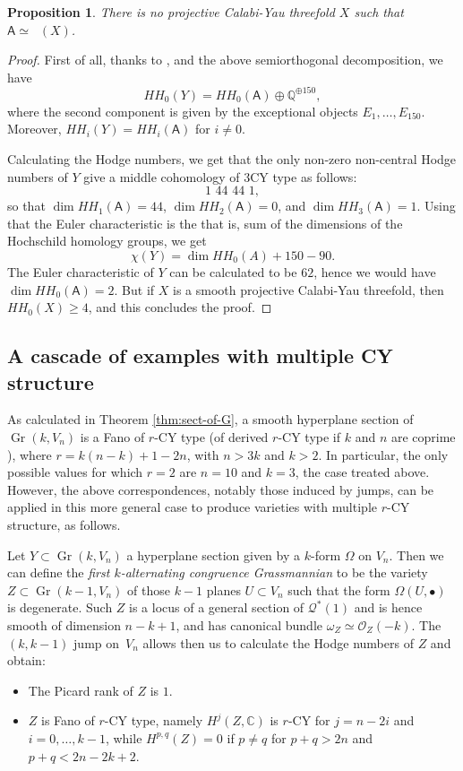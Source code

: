 \documentclass[JEP,XML,SOM,Unicode,NoEqCountersInSection]{cedram}
\newcommand{\sbullet}{{\scriptstyle\bullet}}
\newcommand{\HH}{\textit{HH}}
\let\mathcal\mathscr
\theoremstyle{plain}
\newtheorem{prop}[theorem]{Proposition}
\theoremstyle{definition}
\newcommand{\cat}[1]{\mathsf{#1}}
\DeclareMathOperator{\Db}{{\cat{D}^{\mathrm{b}}}}
\DeclareMathOperator{\Gr}{Gr}
\newcommand{\QQ}{\mathbb{Q}}
\newcommand{\CC}{\mathbb{C}}
\newcommand{\sheaf}[1]{\mathcal{#1}}
\newcommand{\ko}{\sheaf{O}}\let\OO\ko\let\cO\ko
\newcommand{\kq}{\sheaf{Q}}
\begin{document}
\begin{prop}
There is no projective Calabi-Yau threefold $X$ such that $\cat{A} \simeq \Db(X)$.
\end{prop}
\begin{proof}
First of all, thanks to \cite{kuz-hochsch}, and the above semiorthogonal decomposition, we have
\[
\HH_0(Y)=\HH_0(\cat{A}) \oplus \QQ^{\oplus 150},
\]
where the second component is given by the exceptional objects $E_1,\ldots,E_{150}$.
Moreover, $\HH_i(Y)=\HH_i(\cat{A})$ for $i \neq 0$.

Calculating the Hodge numbers, we get that the only non-zero non-central Hodge numbers
of $Y$ give a middle cohomology of 3CY type as follows:
\[
1 \,\, 44 \,\, 44 \,\, 1,
\]
so that $\dim \HH_1(\cat{A})=44$, $\dim \HH_2(\cat{A})=0$, and $\dim \HH_3(\cat{A})=1$.
Using that the Euler characteristic is the that is,  sum of the dimensions of the Hochschild homology groups, we get
\[
\chi(Y)=\dim \HH_0(A) + 150 - 90.
\]
The Euler characteristic of $Y$ can be calculated to be $62$,
hence we would have $\dim \HH_0(\cat{A})=2$. But
if $X$ is a smooth projective Calabi-Yau threefold, then $\HH_0(X) \geq 4$, and this concludes the
proof.
\end{proof}

\subsection{A cascade of examples with multiple CY structure}
As calculated in Theorem \ref{thm:sect-of-G}, a smooth hyperplane
section of $\Gr(k,V_n)$ is a Fano of $r$-CY type (of derived $r$-CY type if $k$ and $n$ are
coprime \cite{kuz-fractional}), where $r=k(n-k)+1-2n$, with $n>3k$ and $k>2$. In particular,
the only possible values for which $r=2$ are $n=10$ and $k=3$, the case treated above.
However, the above correspondences, notably those induced by jumps, can be applied in this more
general case to produce varieties with multiple $r$-CY structure, as follows.

Let $Y \subset \Gr(k,V_n)$ a hyperplane section given by a $k$-form $\Omega$ on $V_n$.
Then we can define the {\it first $k$-alternating congruence Grassmannian} to be the variety
$Z \subset \Gr(k-1,V_n)$ of those $k-1$ planes $U \subset V_n$ such that the form
$\Omega(U,\sbullet)$ is degenerate. Such $Z$ is a locus of a general section of
$\kq^*(1)$ and is hence smooth of dimension $n-k+1$, and has canonical bundle
$\omega_Z \simeq \ko_Z(-k)$. The $(k,k-1)$ jump on~$V_n$ allows then us to calculate the
Hodge numbers of $Z$ and obtain:
\begin{itemize}
\item The Picard rank of $Z$ is $1$.
\item $Z$ is Fano of $r$-CY type, namely $H^j(Z,\CC)$ is $r$-CY for $j=n-2i$
and $i=0,\ldots,k-1$, while $H^{p,q}(Z)=0$ if $p\neq q$ for $p+q > 2n$ and
$p+q < 2n-2k+2$.
\end{itemize}
\end{document}
